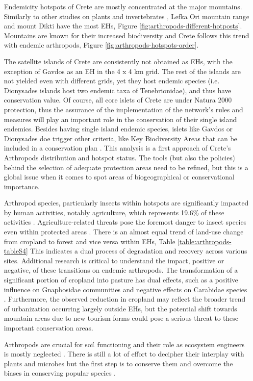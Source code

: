 Endemicity hotspots of Crete are mostly concentrated at the major mountains. 
Similarly to other studies on plants \parencite{dimitrakopoulos2004questioning,kougioumoutzis2020plant}
and invertebrates \parencite{sfenthourakis2001hotspots},
Lefka Ori mountain range and mount Dikti have the most EHs, Figure \ref{fig:arthropods-different-hotposts}.
Mountains are known for their increased biodiversity  \parencite{antonelli2018geological, Rahbek2019} 
and Crete follows this trend with endemic arthropods, Figure \ref{fig:arthropods-hotspots-order}.

The satellite islands of Crete are consistently not obtained as EHs, with the exception of
Gavdos as an EH in the 4 x 4 km grid. The rest of the islands are not yielded
even with different grids, yet they host endemic species (i.e. Dionysades islands
host two endemic taxa of Tenebrionidae), and thus have conservation value.
Of course, all core islets of Crete are under Natura 2000 protection, thus the
assurance of the implementation of the network’s rules and measures will play an
important role in the conservation of their single island endemics.
Besides having single island endemic species, islets like Gavdos or Dionysades doe trigger
other criteria, like Key Biodiversity Areas that can be included in a conservation plan \parencite{farooq2023a-call}.
This analysis is a first approach of Crete’s Arthropods distribution and hotspot status.
The tools (but also the policies) behind the selection of adequate protection
areas need to be refined, but this is a global issue when it comes to spot areas
of biogeographical or conservational importance. 

Arthropod species, particularly insects within hotspots are significantly impacted
by human activities, notably agriculture, which represents 19.6\% of these activities \parencite{raven2021agricultural}.
Agriculture-related threats pose the foremost danger to insect species even within
protected areas \parencite{chowdhury2023protected}. There is an almost equal trend
of land-use change from cropland to forest and vice versa within EHs, Table \ref{table:arthropods-tableS4}
This indicates a dual process of degradation and recovery across various sites.
Additional research is critical to understand the impact, positive or negative, of these transitions on endemic arthropods.
The transformation of a significant portion of cropland into pasture has dual
effects, such as a positive influence on Gnaphosidae communities \parencite{kaltsas2019overgrazed}
and negative effects on Carabidae species \parencite{kaltsas2013ground}.
Furthermore, the observed reduction in cropland may reflect the broader trend
of urbanization occurring largely outside EHs, but the potential shift towards
mountain areas due to new tourism forms could pose a serious threat to these important conservation areas.

Arthropods are crucial for soil functioning and their role as ecosystem engineers 
is mostly neglected \parencite{COLEMAN2024131}. There is still a lot of effort to decipher their interplay 
with plants and microbes but the first step is to conserve them and overcome the 
biases in conserving popular species \parencite{mammola2020towards}.

